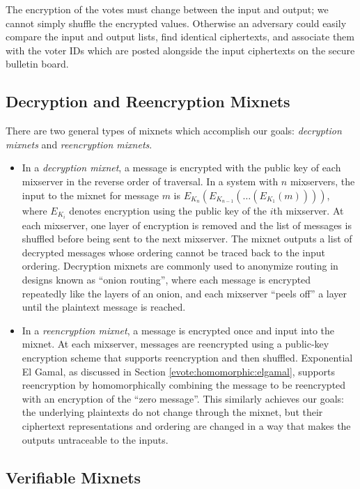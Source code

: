 The encryption of the votes must change between the input and output; we cannot simply shuffle the encrypted values. Otherwise an adversary could easily compare the input and output lists, find identical ciphertexts, and associate them with the voter IDs which are posted alongside the input ciphertexts on the secure bulletin board.

\subsection{Decryption and Reencryption Mixnets} \label{evote:mixnets:types}

There are two general types of mixnets which accomplish our goals: \emph{decryption mixnets} and \emph{reencryption mixnets}.
\begin{itemize}
\item In a \emph{decryption mixnet}, a message is encrypted with the public key of each mixserver in the reverse order of traversal. In a system with $n$ mixservers, the input to the mixnet for message $m$ is $E_{K_n}(E_{K_{n-1}}( \dots (E_{K_1}(m))))$, where $E_{K_i}$ denotes encryption using the public key of the $i$th mixserver. At each mixserver, one layer of encryption is removed and the list of messages is shuffled before being sent to the next mixserver. The mixnet outputs a list of decrypted messages whose ordering cannot be traced back to the input ordering. Decryption mixnets are commonly used to anonymize routing in designs known as ``onion routing'', where each message is encrypted repeatedly like the layers of an onion, and each mixserver ``peels off'' a layer until the plaintext message is reached.
\item In a \emph{reencryption mixnet}, a message is encrypted once and input into the mixnet. At each mixserver, messages are reencrypted using a public-key encryption scheme that supports reencryption and then shuffled. Exponential El Gamal, as discussed in Section \ref{evote:homomorphic:elgamal}, supports reencryption by homomorphically combining the message to be reencrypted with an encryption of the ``zero message''. This similarly achieves our goals: the underlying plaintexts do not change through the mixnet, but their ciphertext representations and ordering are changed in a way that makes the outputs untraceable to the inputs.
\end{itemize}

\subsection{Verifiable Mixnets} \label{evote:mixnets:verifiable}

